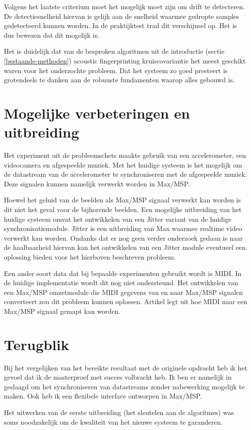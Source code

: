 Volgens het laatste criterium moet het mogelijk moet zijn om drift te detecteren. De detectiesnelheid hiervan is gelijk aan de snelheid waarmee gedropte samples gedetecteerd kunnen worden. In de praktijktest trad dit verschijnsel op. Het is dus bewezen dat dit mogelijk is.

Het is duidelijk dat van de besproken algoritmen uit de introductie (sectie \ref{bestaande-methoden}) acoustic fingerprinting kruiscovariantie het meest geschikt waren voor het onderzochte probleem. Dat het systeem zo goed presteert is grotendeels te danken aan de robuuste fundamenten waarop alles gebouwd is.

\section{Mogelijke verbeteringen en uitbreiding}

Het experiment uit de probleemschets maakte gebruik van een accelerometer, een videocamera en afgespeelde muziek. Met het huidige systeem is het mogelijk om de datastream van de accelerometer te synchroniseren met de afgespeelde muziek. Deze signalen kunnen namelijk verwerkt worden in Max/MSP. 

Hoewel het geluid van de beelden als Max/MSP signaal verwerkt kan worden is dit niet het geval voor de bijhorende beelden. Een mogelijke uitbreiding van het huidige systeem omvat het ontwikkelen van een Jitter variant van de huidige synchronisatiemodule. Jitter is een uitbreiding van Max waarmee realtime video verwerkt kan worden. Ondanks dat er nog geen verder onderzoek gedaan is naar de haalbaarheid hiervan kan het ontwikkelen van een Jitter module eventueel een oplossing bieden voor het hierboven beschreven probleem.

Een ander soort data dat bij bepaalde experimenten gebruikt wordt is MIDI. In de huidige implementatie wordt dit nog niet ondersteund. Het ontwikkelen van een Max/MSP omzetmodule die MIDI gegevens van en naar Max/MSP signalen converteert zou dit probleem kunnen oplossen. Artikel \cite{mspmidi} legt uit hoe MIDI naar een Max/MSP signaal gemapt kan worden.

\section{Terugblik}

Bij het vergelijken van het bereikte resultaat met de originele opdracht heb ik het gevoel dat ik de masterproef met succes volbracht heb. Ik ben er namelijk in geslaagd om het synchroniseren van datastreams zonder nabewerking mogelijk te maken. Ook heb ik een flexibele interface ontworpen in Max/MSP.

Het uitwerken van de eerste uitbreiding (het sleutelen aan de algoritmes) was soms noodzakelijk om de kwaliteit van het nieuwe systeem te garanderen.